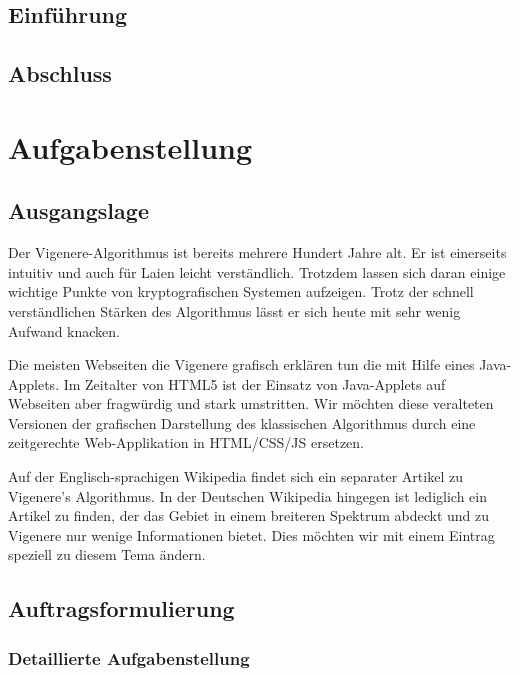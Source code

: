 \documentclass[11pt,paper=a4,final]{scrartcl}
\begin{document}
\subsection{Einf\"uhrung}
\subsection{Abschluss}
\section{Aufgabenstellung}
\subsection{Ausgangslage}
Der Vigenere-Algorithmus ist bereits mehrere Hundert Jahre alt. Er ist
einerseits intuitiv und auch f\"ur Laien leicht verst\"andlich. Trotzdem lassen
sich daran einige wichtige Punkte von kryptografischen Systemen aufzeigen. Trotz
der schnell verst\"andlichen St\"arken des Algorithmus l\"asst er sich heute mit
sehr wenig Aufwand knacken. 

Die meisten Webseiten die Vigenere grafisch erkl\"aren tun die mit Hilfe eines
Java-Applets. Im Zeitalter von HTML5 ist der Einsatz von Java-Applets auf
Webseiten aber fragw\"urdig und stark umstritten. Wir m\"ochten diese veralteten
Versionen der grafischen Darstellung des klassischen Algorithmus durch eine
zeitgerechte Web-Applikation in HTML/CSS/JS ersetzen.

Auf der Englisch-sprachigen Wikipedia findet sich ein separater Artikel zu
Vigenere's Algorithmus. In der Deutschen Wikipedia hingegen ist lediglich ein
Artikel zu finden, der das Gebiet in einem breiteren Spektrum abdeckt und zu
Vigenere nur wenige Informationen bietet. Dies m\"ochten wir mit einem Eintrag
speziell zu diesem Tema \"andern.
\subsection{Auftragsformulierung}
\subsubsection{Detaillierte Aufgabenstellung}
\end{document}
